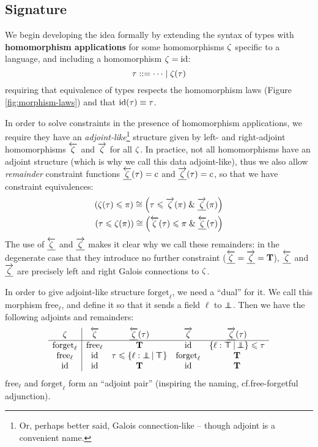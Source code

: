 \subsection{Signature}

We begin developing the idea formally by extending the syntax of types with \textbf{homomorphism applications} for some homomorphisms $\zeta$ specific to a language, and including a homomorphism $\zeta = \mathrm{id}$:
$$ \tau ::= \cdots \mid \zeta(\tau) $$
requiring that equivalence of types respects the homomorphism laws (Figure \ref{fig:morphism-laws}) and that $\mathrm{id}(\tau) \equiv \tau$. 

In order to solve constraints in the presence of homomorphism applications, we require they have an \emph{adjoint-like}\footnote{Or, perhaps better said, Galois connection-like -- though adjoint is a convenient name.} structure given by left- and right-adjoint homomorphisms $\overleftarrow{\zeta}$ and $\overrightarrow{\zeta}$ for all $\zeta$. In practice, not all homomorphisms have an adjoint structure (which is why we call this data adjoint-like), thus we also allow \emph{remainder} constraint functions $\underline{\overleftarrow{\zeta}}(\tau) = c$ and $\underline{\overrightarrow{\zeta}}(\tau) = c$, so that we have constraint equivalences:
\begin{align*}
(\morph(\tau) \sub \pi) \cstreq \left(\tau \sub \radj \morph(\pi) \und \radjrest \morph(\pi) \right) \\
(\tau \sub \morph(\pi)) \cstreq \left(\ladj \morph(\tau) \sub \pi \und \ladjrest \morph(\tau) \right)
\end{align*}
The use of $\underline{\overleftarrow{\zeta}}$ and $\underline{\overrightarrow{\zeta}}$ makes it clear why we call these remainders: in the degenerate case that they introduce no further constraint ($\underline{\overleftarrow{\zeta}} = \underline{\overrightarrow{\zeta}} = \mathbf T$), $\underline{\overleftarrow{\zeta}}$ and $\underline{\overrightarrow{\zeta}}$ are precisely left and right Galois connections to $\zeta$.

\begin{example}
    In order to give adjoint-like structure $\mathrm{forget}_\ell$, we need a \enquote{dual} for it. We call this morphism $\mathrm{free}_\ell$, and define it so that it sends a field $\ell$ to $\bot \!\!\!\! \bot$. Then we have the following adjoints and remainders:
    $$\begin{array}{c|cccc}
    \morph & \ladj \morph & \ladjrest \morph(\tau) & \radj \morph & \radjrest \morph(\tau) \\ \hline 
    \mathrm{forget}_\ell & \mathrm{free}_\ell & \tru & \mathrm{id} & \flext{\ell : \flftop}{\flfbot} \sub \tau \\
    \mathrm{free}_\ell & \mathrm{id} & \tau \sub \flext{\ell : \flfbot}{\flftop} & \mathrm{forget}_\ell & \tru \\ 
    \mathrm{id} & \mathrm{id} & \tru & \mathrm{id} & \tru 
    \end{array}$$
    $\mathrm{free}_\ell$ and $\mathrm{forget}_\ell$ form an \enquote{adjoint pair} (inspiring the naming, cf.\@ free-forgetful adjunction).
\end{example}

